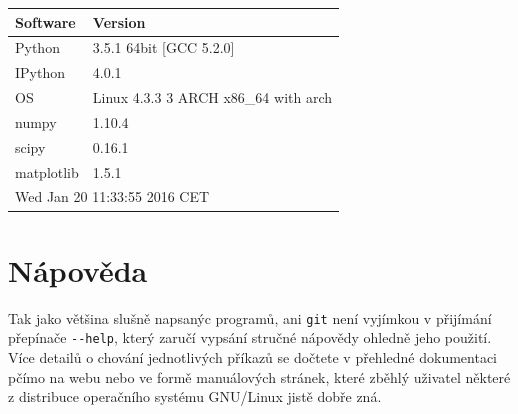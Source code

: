 \documentclass{report}
\begin{document}
    \begin{tabular}{|l|l|}\hline
{\bf Software} & {\bf Version} \\ \hline\hline
Python & 3.5.1 64bit [GCC 5.2.0] \\ \hline
IPython & 4.0.1 \\ \hline
OS & Linux 4.3.3 3 ARCH x86\_64 with arch \\ \hline
numpy & 1.10.4 \\ \hline
scipy & 0.16.1 \\ \hline
matplotlib & 1.5.1 \\ \hline
\hline \multicolumn{2}{|l|}{Wed Jan 20 11:33:55 2016 CET} \\ \hline
\end{tabular}

    

    \section*{Nápověda}\label{nuxe1povux11bda}

Tak jako většina slušně napsanýc programů, ani \texttt{git} není
vyjímkou v přijímání přepínače \texttt{-\/-help}, který zaručí vypsání
stručné nápovědy ohledně jeho použití. Více detailů o chování
jednotlivých příkazů se dočtete v přehledné dokumentaci pčímo na webu
nebo ve formě manuálových stránek, které zběhlý uživatel některé z
distribuce operačního systému GNU/Linux jistě dobře zná.
\end{document}
